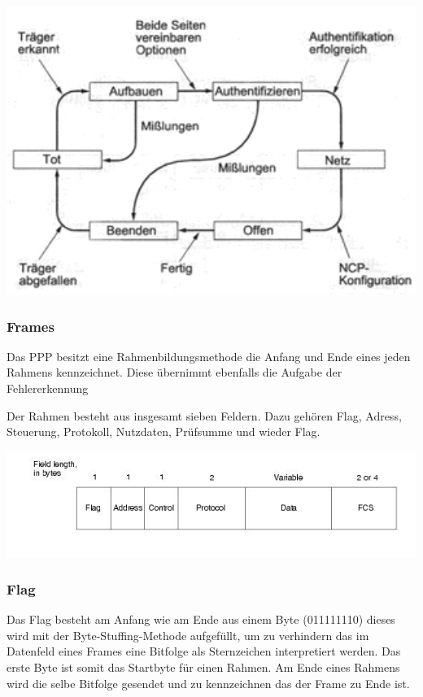 \documentclass[12pt, a4paper, ngerman]{article}
\begin{document}
\includegraphics[width=1\textwidth]{Grafiken/ppp.jpg}


\subsubsection{Frames}

Das PPP besitzt eine Rahmenbildungsmethode die Anfang und Ende eines jeden Rahmens kennzeichnet. Diese übernimmt ebenfalls die Aufgabe der Fehlererkennung

Der Rahmen besteht aus insgesamt sieben Feldern. Dazu gehören Flag, Adress, Steuerung,  Protokoll, Nutzdaten, Prüfsumme und wieder Flag.

\includegraphics[width=1\textwidth]{Grafiken/ppp-frame.jpg}

\subsubsection{Flag}

Das Flag besteht am Anfang wie am Ende aus einem Byte (011111110) dieses wird mit der Byte-Stuffing-Methode aufgefüllt, um zu verhindern das im Datenfeld eines Frames eine Bitfolge als Sternzeichen interpretiert werden. Das erste Byte ist somit das Startbyte für einen Rahmen. Am Ende eines Rahmens wird die selbe Bitfolge gesendet und zu kennzeichnen das der Frame zu Ende ist.
\end{document}
